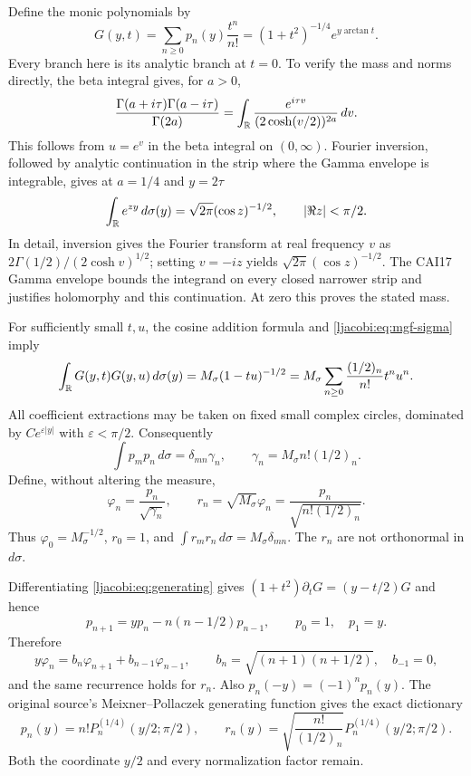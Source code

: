 \documentclass[11pt]{article}
\begin{document}
Define the monic polynomials by
\begin{equation}\label{ljacobi:eq:generating}
 G(y,t)=\sum_{n\geq0}p_n(y)\frac{t^n}{n!}
       =(1+t^2)^{-1/4}e^{y\arctan t}.
\end{equation}
Every branch here is its analytic branch at $t=0$. To verify the
mass and norms directly, the beta integral gives, for $a>0$,
\[
 \frac{\Gamma(a+i\tau)\Gamma(a-i\tau)}{\Gamma(2a)}
 =\int_\mathbb R\frac{e^{i\tau v}}{(2\cosh(v/2))^{2a}}\,dv.
\]
This follows from $u=e^v$ in the beta integral on $(0,\infty)$.
Fourier inversion, followed by analytic continuation in the strip
where the Gamma envelope is integrable, gives at $a=1/4$ and $y=2\tau$
\begin{equation}\label{ljacobi:eq:mgf-sigma}
 \int_\mathbb R e^{zy}\,d\sigma(y)
 =\sqrt{2\pi}(\cos z)^{-1/2},\qquad |\Re z|<\pi/2.
\end{equation}
In detail, inversion gives the Fourier transform at real frequency
$v$ as $2\Gamma(1/2)/(2\cosh v)^{1/2}$; setting $v=-iz$ yields
$\sqrt{2\pi}(\cos z)^{-1/2}$. The CAI17 Gamma envelope bounds the
integrand on every closed narrower strip and justifies holomorphy
and this continuation. At zero this proves the stated mass.

For sufficiently small $t,u$, the cosine addition formula and
\eqref{ljacobi:eq:mgf-sigma} imply
\[
 \int_\mathbb R G(y,t)G(y,u)\,d\sigma(y)
 =M_\sigma(1-tu)^{-1/2}
 =M_\sigma\sum_{n\geq0}\frac{(1/2)_n}{n!}t^nu^n.
\]
All coefficient extractions may be taken on fixed small complex
circles, dominated by $Ce^{\varepsilon|y|}$ with $\varepsilon<\pi/2$.
Consequently
\[
 \int p_m p_n\,d\sigma=\delta_{mn}\gamma_n,
 \qquad\gamma_n=M_\sigma n!(1/2)_n.
\]
Define, without altering the measure,
\[
 \varphi_n=\frac{p_n}{\sqrt{\gamma_n}},\qquad
 r_n=\sqrt{M_\sigma}\varphi_n
     =\frac{p_n}{\sqrt{n!(1/2)_n}}.
\]
Thus $\varphi_0=M_\sigma^{-1/2}$, $r_0=1$, and
$\int r_mr_n\,d\sigma=M_\sigma\delta_{mn}$.
The $r_n$ are not orthonormal in $d\sigma$.

Differentiating \eqref{ljacobi:eq:generating} gives
$(1+t^2)\partial_tG=(y-t/2)G$ and hence
\[
 p_{n+1}=yp_n-n(n-1/2)p_{n-1},\qquad p_0=1,\quad p_1=y.
\]
Therefore
\begin{equation}\label{ljacobi:eq:recurrence}
 y\varphi_n=b_n\varphi_{n+1}+b_{n-1}\varphi_{n-1},\qquad
 b_n=\sqrt{(n+1)(n+1/2)},\quad b_{-1}=0,
\end{equation}
and the same recurrence holds for $r_n$. Also $p_n(-y)=(-1)^np_n(y)$.
The original source's Meixner--Pollaczek generating function gives
the exact dictionary
\[
 p_n(y)=n!P_n^{(1/4)}(y/2;\pi/2),\qquad
 r_n(y)=\sqrt{\frac{n!}{(1/2)_n}}P_n^{(1/4)}(y/2;\pi/2).
\]
Both the coordinate $y/2$ and every normalization factor remain.
\end{document}
